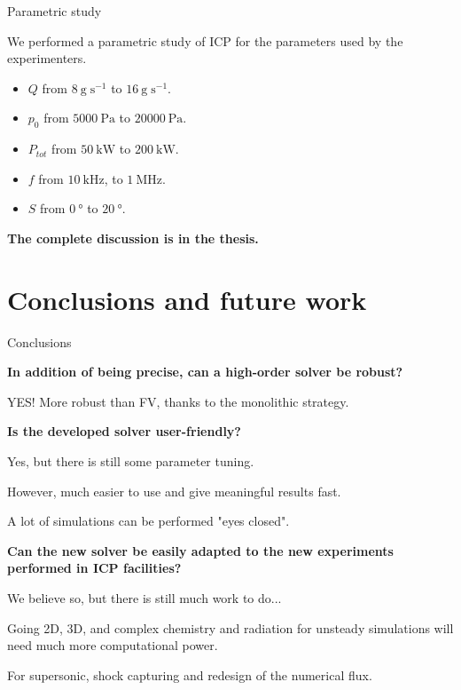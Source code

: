 \documentclass[24pt,t,table, aspectratio=169]{beamer}
\begin{document}
\begin{frame}{Parametric study}

We performed a parametric study of ICP for the parameters used by the experimenters.

\begin{itemize}
\item $Q$ from $\SI{8}{\gram\;\second^{-1}}$ to $\SI{16}{\gram\;\second^{-1}}$.
\item $p_0$ from $\SI{5000}{\pascal}$ to $\SI{20000}{\pascal}$.
\item $P_{tot}$ from $\SI{50}{\kilo\watt}$ to $\SI{200}{\kilo\watt}$.
\item $f$ from $\SI{10}{\kilo\hertz}$, to $\SI{1}{\mega\hertz}$.
\item $S$ from $\SI{0}{\degree}$ to $\SI{20}{\degree}$.
\end{itemize}

\begin{framed}
\centering
\textbf{The complete discussion is in the thesis.}
\end{framed}

\end{frame}




\section{Conclusions and future work}

\begin{frame}{Conclusions}

\begin{description}

{
\item[Q1] \textbf{In addition of being precise, can a high-order solver be robust?}
}

{
YES! More robust than FV, thanks to the monolithic strategy.
}

{
\item[Q2] \textbf{Is the developed solver user-friendly?} 
}
{

Yes, but there is still some parameter tuning.

However, much easier to use and give meaningful results fast.

A lot of simulations can be performed "eyes closed".
 
}

{
\item[Q3] \textbf{Can the new solver be easily adapted to the new experiments performed in ICP facilities?}
}

{
We believe so, but there is still much work to do...

Going 2D, 3D, and complex chemistry and radiation for unsteady simulations will need much more computational power.

For supersonic, shock capturing and redesign of the numerical flux.
}

\end{description}

\end{frame}
\end{document}
